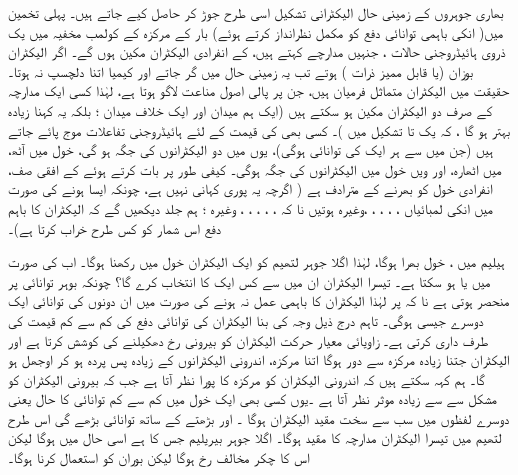 بھاری جوہروں کے زمینی حال الیکٹرانی تشکیل اسی طرح جوڑ کر حاصل کیے جاتے ہیں۔ پہلی تخمین  میں( انکی باہمی توانائی دفع کو مکمل نظرانداز کرتے ہوئے)  بار  کے مرکزہ کے کولمب مخفیہ میں یک  ذروی ہائیڈروجنی حالات ،  جنہیں مدارچے کہتے ہیں، کے  انفرادی الیکٹران مکین ہوں گے۔ اگر الیکٹران بوزان (یا قابل  ممیز ذرات ) ہوتے تب یہ زمینی حال  میں  گر جاتے اور کیمیا اتنا دلچسپ نہ ہوتا۔ حقیقت میں الیکٹران متماثل فرمیان ہیں، جن پر پالی اصول مناعت لاگو ہوتا ہے،  لہٰذا کسی ایک مدارچہ کے  صرف دو الیکٹران مکین ہو   سکتے ہیں  (ایک ہم میدان اور ایک خلاف میدان ؛ بلکہ یہ کہنا زیادہ بہتر  ہو گا ، کہ   یک تا  تشکیل  میں  )۔ کسی بھی  کی قیمت کے لئے  ہائیڈروجنی تفاعلات موج پائے جاتے ہیں  (جن میں سے ہر ایک کی توانائی  ہوگی)، یوں    میں دو الیکٹرانوں کی جگہ ہو گی،   خول میں آٹھ،   میں اٹھارہ،  اور ویں خول میں  الیکٹرانوں کی جگہ ہوگی۔ کیفی طور پر بات کرتے ہوئے   کے افقی صف،  انفرادی خول کو  بھرنے کے مترادف ہے ( اگرچہ یہ پوری کہانی نہیں ہے،  چونکہ ایسا ہونے کی صورت میں انکی لمبائیاں ،  ،  ،  ،  ،وغیرہ ہوتیں  نا کہ  ،  ،  ،  ،  ، وغیرہ ؛ ہم جلد دیکھیں گے کہ الیکٹران کا باہم   دفع اس شمار کو کس طرح خراب کرتا ہے)۔

ہیلیم میں ،  خول  بھرا ہوگا،  لہٰذا اگلا جوہر لتھیم  کو ایک الیکٹران  خول میں رکھنا ہوگا۔ اب  کی صورت میں  یا  ہو سکتا ہے۔ تیسرا الیکٹران ان میں سے کس ایک کا انتخاب کرے گا؟ چونکہ بوہر توانائی  پر منحصر ہوتی ہے نا کہ  پر لہٰذا الیکٹران کا باہمی عمل نہ ہونے کی صورت میں ان دونوں کی توانائی ایک دوسرے جیسی ہوگی۔ تاہم درج ذیل وجہ کی بنا الیکٹران کی توانائی دفع    کی کم سے کم قیمت کی طرف داری کرتی ہے۔  زاویائی معیار حرکت الیکٹران کو بیرونی رخ دھکیلنے کی کوشش کرتا ہے اور الیکٹران جتنا  زیادہ  مرکزہ سے دور ہوگا  اتنا مرکزہ،  اندرونی الیکٹرانوں  کے زیادہ پس پردہ ہو  کر اوجھل ہو گا۔  ہم کہہ سکتے ہیں کہ اندرونی الیکٹران کو مرکزہ کا پورا   نظر آتا ہے جب کہ بیرونی الیکٹران کو مشکل سے    سے زیادہ موثر  نظر آتا ہے ۔یوں کسی بھی ایک خول میں کم سے کم توانائی کا حال یعنی دوسرے لفظوں میں سب سے سخت مقید الیکٹران     ہوگا ۔ اور بڑھتے      کے ساتھ توانائی بڑھے گی اس طرح لتھیم میں تیسرا الیکٹران مدارچہ     کا مقید ہوگا۔ اگلا جوہر بیریلیم جس کا      ہے اسی حال میں ہوگا لیکن اس کا چکر مخالف رخ ہوگا لیکن بوران      کو     استعمال کرنا ہوگا۔ 
 
